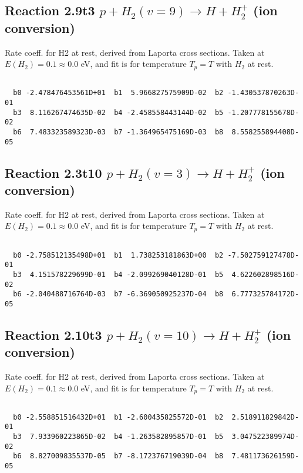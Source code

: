 \documentclass[12pt,dvipdfmx]{article}
\begin{document}
\newpage
\subsection{
Reaction 2.9t3
$ p + H_2(v=9) \rightarrow H + H_2^+$ (ion conversion)
}
Rate coeff. for H2 at rest, derived from Laporta cross sections.
Taken at $E(H_2) = 0.1 \approx 0.0$ eV,  and fit is for temperature $T_p=T$ with $H_2$ at rest.

\begin{small}\begin{verbatim}

  b0 -2.478476453561D+01  b1  5.966827575909D-02  b2 -1.430537870263D-01
  b3  8.116267474635D-02  b4 -2.458558443144D-02  b5 -1.207778155678D-02
  b6  7.483323589323D-03  b7 -1.364965475169D-03  b8  8.558255894408D-05

\end{verbatim}\end{small}

\newpage
\subsection{
Reaction 2.3t10
$ p + H_2(v=3) \rightarrow H + H_2^+$ (ion conversion)
}
Rate coeff. for H2 at rest, derived from Laporta cross sections.
Taken at $E(H_2) = 0.1 \approx 0.0$ eV,  and fit is for temperature $T_p=T$ with $H_2$ at rest.

\begin{small}\begin{verbatim}

  b0 -2.758512135498D+01  b1  1.738253181863D+00  b2 -7.502759127478D-01
  b3  4.151578229699D-01  b4 -2.099269040128D-01  b5  4.622602898516D-02
  b6 -2.040488716764D-03  b7 -6.369050925237D-04  b8  6.777325784172D-05

\end{verbatim}\end{small}

\newpage
\subsection{
Reaction 2.10t3
$ p + H_2(v=10) \rightarrow H + H_2^+$ (ion conversion)
}
Rate coeff. for H2 at rest, derived from Laporta cross sections.
Taken at $E(H_2) = 0.1 \approx 0.0$ eV,  and fit is for temperature $T_p=T$ with $H_2$ at rest.

\begin{small}\begin{verbatim}

  b0 -2.558851516432D+01  b1 -2.600435825572D-01  b2  2.518911829842D-01
  b3  7.933960223865D-02  b4 -1.263582895857D-01  b5  3.047522389974D-02
  b6  8.827009835537D-05  b7 -8.172376719039D-04  b8  7.481173626159D-05

\end{verbatim}\end{small}
\end{document}

